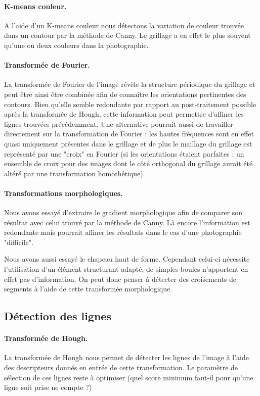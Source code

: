 \documentclass[10pt,a4paper]{article}
\begin{document}
\paragraph{K-means couleur. }A l'aide d'un K-means couleur nous détectons la variation de couleur trouvée dans un contour par la méthode de Canny. Le grillage a en effet le plus souvent qu'une ou deux couleurs dans la photographie.

\paragraph{Transformée de Fourier. }La transformée de Fourier de l'image révèle la structure périodique du grillage et peut être ainsi être combinée afin de connaître les orientations pertinentes des contours. Bien qu'elle semble redondante par rapport au post-traitement possible après la transformée de Hough, cette information peut permettre d'affiner les lignes trouvées précédemment. Une alternative pourrait aussi de travailler directement sur la transformation de Fourier : les hautes fréquences sont en effet quasi uniquement présentes dans le grillage et de plus le maillage du grillage est représenté par une "croix" en Fourier (si les orientations étaient parfaites : un ensemble de croix pour des images dont le côté orthogonal du grillage aurait été altéré par une transformation homothétique).

\paragraph{Transformations morphologiques. }Nous avons essayé d'extraire le gradient morphologique afin de comparer son résultat avec celui trouvé par la méthode de Canny. Là encore l'information est redondante mais pourrait affiner les résultats dans le cas d'une photographie "difficile".

Nous avons aussi essayé le chapeau haut de forme. Cependant celui-ci nécessite l'utilisation d'un élément structurant adapté, de simples boules n'apportent en effet pas d'information. On peut donc penser à détecter des croisements de segments à l'aide de cette transformée morphologique.

\subsection{Détection des lignes}
\paragraph{Transformée de Hough. }La transformée de Hough nous permet de détecter les lignes de l'image à l'aide des descripteurs donnés en entrée de cette transformation. Le paramètre de sélection de ces lignes reste à optimiser (quel score minimum faut-il pour qu'une ligne soit prise ne compte ?)
\end{document}
